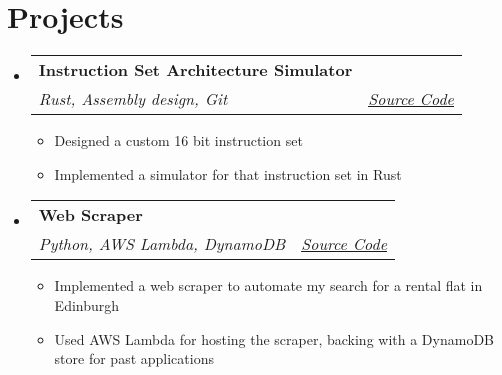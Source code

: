 \documentclass[a4paper,11pt]{article}
\makeatletter
\newcommand{\resumeItem}[1]{
  \item\small{#1}
}
\newcommand{\resumeItemListStart}{\begin{itemize}[rightmargin=0.11in]}
\newcommand{\resumeItemListEnd}{\end{itemize}}
\newcommand{\resumeQuadHeading}[4]{
  \item
  \begin{tabular*}{0.96\textwidth}[t]{l@{\extracolsep{\fill}}r}
    \textbf{#1} & #2 \\
    \textit{\small#3} & \textit{\small #4} \\
  \end{tabular*}
}
\newcommand{\resumeHeadingListStart}{
  \begin{itemize}[leftmargin=0.15in, label={}]
}
\newcommand{\resumeHeadingListEnd}{\end{itemize}}
\makeatother
\begin{document}

\section{Projects}
  \resumeHeadingListStart{}
    \resumeQuadHeading{Instruction Set Architecture Simulator}{}
    {Rust, Assembly design, Git}{\href{https://github.com/TomLonergan03/isa}{\uline{Source Code}}}
      \resumeItemListStart{}
        \resumeItem{Designed a custom 16 bit instruction set}
        \resumeItem{Implemented a simulator for that instruction set in Rust}
      \resumeItemListEnd{}
    \resumeQuadHeading{Web Scraper}{}{Python, AWS Lambda, DynamoDB}{\href{https://github.com/TomLonergan03/rental-bot}{\uline{Source Code}}}
      \resumeItemListStart{}
        \resumeItem{Implemented a web scraper to automate my search for a rental flat in Edinburgh}
        \resumeItem{Used AWS Lambda for hosting the scraper, backing with a DynamoDB store for past applications}
      \resumeItemListEnd{}
  \resumeHeadingListEnd{}



\end{document}
